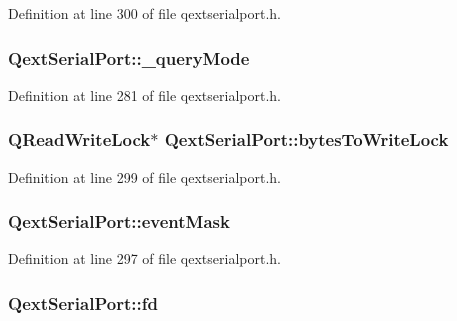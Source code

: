 Definition at line 300 of file qextserialport.\-h.

\hypertarget{class_qext_serial_port_a5c079292fed2f4c283ad88fedf005f11}{
\subsubsection[{\-\_\-query\-Mode}]{ Qext\-Serial\-Port\-::\-\_\-query\-Mode\hspace{0.3cm}{\ttfamily [protected]}}}\label{class_qext_serial_port_a5c079292fed2f4c283ad88fedf005f11}


Definition at line 281 of file qextserialport.\-h.

\hypertarget{class_qext_serial_port_a47de1fe5a7dcbac828fef5bc8a7aec65}{
\subsubsection[{bytes\-To\-Write\-Lock}]{\setlength{\rightskip}{0pt plus 5cm}Q\-Read\-Write\-Lock$\ast$ Qext\-Serial\-Port\-::bytes\-To\-Write\-Lock\hspace{0.3cm}{\ttfamily [protected]}}}\label{class_qext_serial_port_a47de1fe5a7dcbac828fef5bc8a7aec65}


Definition at line 299 of file qextserialport.\-h.

\hypertarget{class_qext_serial_port_a41f809227f22fc1deb0532436b97b658}{
\subsubsection[{event\-Mask}]{ Qext\-Serial\-Port\-::event\-Mask\hspace{0.3cm}{\ttfamily [protected]}}}\label{class_qext_serial_port_a41f809227f22fc1deb0532436b97b658}


Definition at line 297 of file qextserialport.\-h.

\hypertarget{class_qext_serial_port_a08fc6251406db64921e535a183aab90b}{
\subsubsection[{fd}]{ Qext\-Serial\-Port\-::fd\hspace{0.3cm}{\ttfamily [protected]}}}\label{class_qext_serial_port_a08fc6251406db64921e535a183aab90b}


